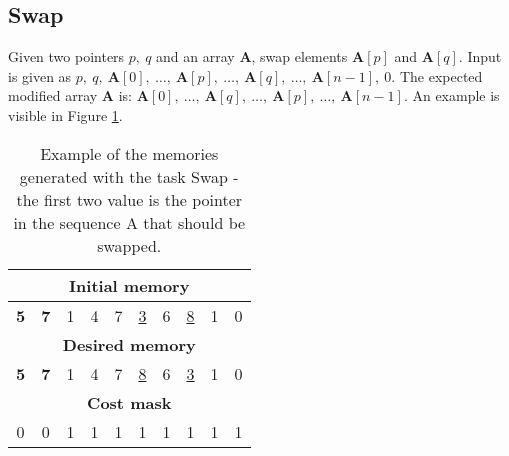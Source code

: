 \subsection{Swap}
Given two pointers $p,\ q$ and an array \textbf{A}, swap elements $\textbf{A}[p]$ and $\textbf{A}[q]$. Input is given as $p,\ q,\ \textbf{A}[0],\ \dots,\ \textbf{A}[p],\ \dots,\ \textbf{A}[q],\ \dots,\ \textbf{A}[n-1],\ 0$. The expected modified array \textbf{A} is: $\textbf{A}[0],\ \dots,\ \textbf{A}[q],\ \dots,\ \textbf{A}[p],\ \dots,\ \textbf{A}[n-1]$. An example is visible in Figure \ref{fig:swap-example}.
\begin{table}[h!]
	\centering
	\begin{tabular}{|c|c|c|c|c|c|c|c|c|c|}
		\hline
		\multicolumn{10}{|c|}{\textbf{Initial memory}} \\ \hline
		\textbf{5} & \textbf{7} & 1 & 4 & 7 & \underline{3} & 6 & \underline{8} & 1 & 0 \\ \hline\hline\hline
		\multicolumn{10}{|c|}{\textbf{Desired memory}} \\ \hline
		\textbf{5} & \textbf{7} & 1 & 4 & 7 & \underline{8} & 6 & \underline{3} & 1 & 0 \\ \hline\hline\hline
		\multicolumn{10}{|c|}{\textbf{Cost mask}} \\ \hline
		0 & 0 & 1 & 1 & 1 & 1 & 1 & 1 & 1 & 1 \\ \hline
	\end{tabular}
	\caption{Example of the memories generated with the task Swap - the first two value is the pointer in the sequence A that should be swapped.}
	\label{fig:swap-example}
\end{table}
\FloatBarrier


